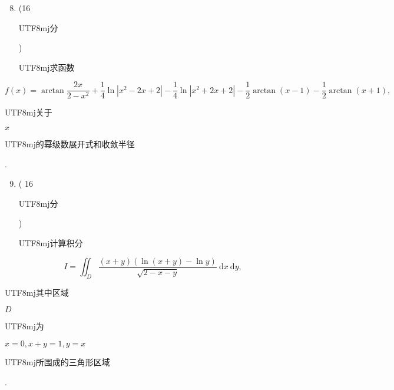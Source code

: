 \documentclass[10pt]{article}
\begin{document}
\begin{enumerate}
  \setcounter{enumi}{7}
  \item (16 \begin{CJK}{UTF8}{mj}分\end{CJK}) \begin{CJK}{UTF8}{mj}求函数\end{CJK}
\end{enumerate}
$$
f(x)=\arctan \frac{2 x}{2-x^{2}}+\frac{1}{4} \ln \left|x^{2}-2 x+2\right|-\frac{1}{4} \ln \left|x^{2}+2 x+2\right|-\frac{1}{2} \arctan (x-1)-\frac{1}{2} \arctan (x+1),
$$
\begin{CJK}{UTF8}{mj}关于\end{CJK} $x$ \begin{CJK}{UTF8}{mj}的幂级数展开式和收敛半径\end{CJK}.

\begin{enumerate}
  \setcounter{enumi}{8}
  \item ( 16 \begin{CJK}{UTF8}{mj}分\end{CJK}) \begin{CJK}{UTF8}{mj}计算积分\end{CJK}
\end{enumerate}
$$
I=\iint_{D} \frac{(x+y)(\ln (x+y)-\ln y)}{\sqrt{2-x-y}} \mathrm{~d} x \mathrm{~d} y,
$$
\begin{CJK}{UTF8}{mj}其中区域\end{CJK} $D$ \begin{CJK}{UTF8}{mj}为\end{CJK} $x=0, x+y=1, y=x$ \begin{CJK}{UTF8}{mj}所围成的三角形区域\end{CJK}.
\end{document}
